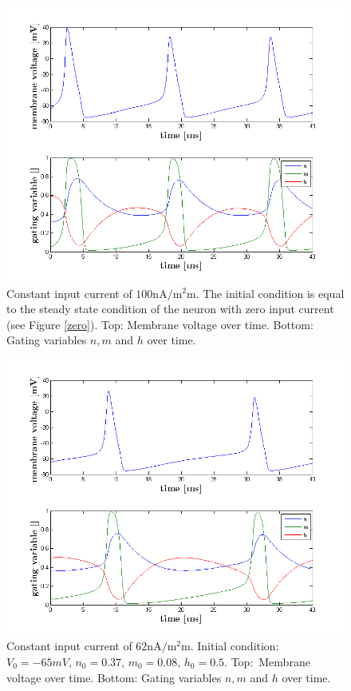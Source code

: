 \documentclass{scrartcl}
\begin{document}
\begin{figure}
\centering
\includegraphics[trim = {1.4cm 0.3 1.8cm 1cm}, height=0.35\textheight, clip]{../pics/large}
\caption{Constant input current of $100 \si{\nano\ampere\per\square\milli\meter}$. The initial condition is equal to the steady state condition of the neuron with zero input current (see Figure \ref{zero}). Top: Membrane voltage over time. Bottom: Gating variables $n, m$ and $h$ over time.}
\label{large}
\end{figure}

\begin{figure}
\centering
\includegraphics[trim = {1.4cm 0.3 1.8cm 1cm}, height=0.35\textheight, clip]{../pics/med}
\caption{Constant input current of $62 \si{\nano\ampere\per\square\milli\meter}$. Initial condition: $V_0=-65\si{mV}$, $n_0=0.37$, $m_0=0.08$, $h_0 = 0.5$. Top:~Membrane voltage over time. Bottom: Gating variables $n, m$ and $h$ over time.}
\label{med}
\end{figure}
\end{document}
